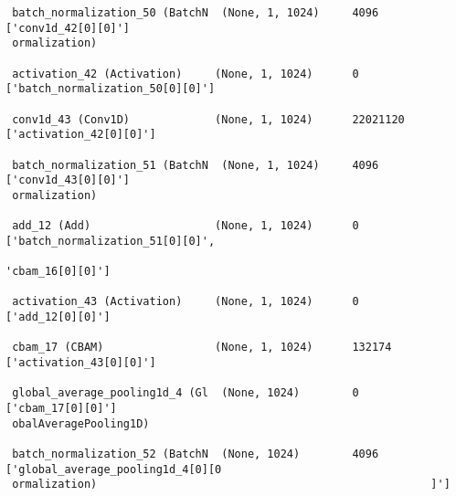 \begin{lstlisting}
 batch_normalization_50 (BatchN  (None, 1, 1024)     4096        ['conv1d_42[0][0]']              
 ormalization)                                                                                    
                                                                                                  
 activation_42 (Activation)     (None, 1, 1024)      0           ['batch_normalization_50[0][0]'] 
                                                                                                  
 conv1d_43 (Conv1D)             (None, 1, 1024)      22021120    ['activation_42[0][0]']          
                                                                                                  
 batch_normalization_51 (BatchN  (None, 1, 1024)     4096        ['conv1d_43[0][0]']              
 ormalization)                                                                                    
                                                                                                  
 add_12 (Add)                   (None, 1, 1024)      0           ['batch_normalization_51[0][0]', 
                                                                  'cbam_16[0][0]']                
                                                                                                  
 activation_43 (Activation)     (None, 1, 1024)      0           ['add_12[0][0]']                 
                                                                                                  
 cbam_17 (CBAM)                 (None, 1, 1024)      132174      ['activation_43[0][0]']          
                                                                                                  
 global_average_pooling1d_4 (Gl  (None, 1024)        0           ['cbam_17[0][0]']                
 obalAveragePooling1D)                                                                            
                                                                                                  
 batch_normalization_52 (BatchN  (None, 1024)        4096        ['global_average_pooling1d_4[0][0
 ormalization)                                                   ]']                              
                                                                                                  

\end{lstlisting}
